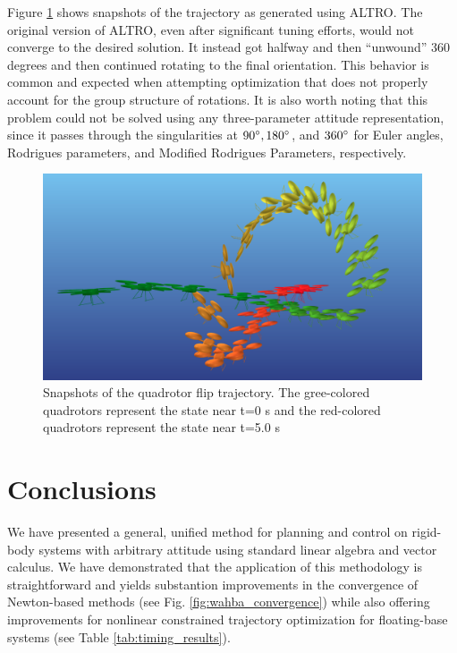\documentclass[letterpaper, 10 pt, conference]{ieeeconf}  %
\begin{document}
	    Figure \ref{fig:quad_flip} shows snapshots of the trajectory as generated using
	    ALTRO. The original version of ALTRO, even after significant tuning efforts,
	    would not converge to the desired solution. It instead got halfway and then
	    ``unwound'' 360 degrees and then continued rotating to the final orientation.
	    This behavior is common and expected when attempting optimization that does not
	    properly account for the group structure of rotations. It is also worth noting
	    that this problem could not be solved using any three-parameter attitude
	    representation, since it passes through the singularities at $90\degree,
	    180\degree$, and $360\degree$ for Euler angles, Rodrigues parameters, and
	    Modified Rodrigues Parameters, respectively.

        \begin{figure}[t]
            \centering
            \includegraphics[width=\columnwidth]{figures/quadflip.png}
            \caption{Snapshots of the quadrotor flip trajectory. The
                gree-colored quadrotors represent the state near t=0 s and the
                red-colored quadrotors represent the state near t=5.0 s
            }
            \label{fig:quad_flip}
        \end{figure}    
    

\section{Conclusions} \label{sec:conclusion}
    We have presented a general, unified method for planning and control on rigid-body
    systems with arbitrary attitude using standard linear algebra and vector calculus.
    We have demonstrated that the application of this methodology is straightforward and
    yields substantion improvements in the convergence of Newton-based methods (see Fig. 
    \ref{fig:wahba_convergence}) while also offering improvements for nonlinear constrained
    trajectory optimization for floating-base systems (see Table \ref{tab:timing_results}).
    
\end{document}
